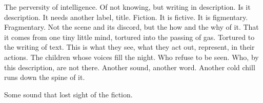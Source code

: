

The perversity of intelligence.  Of not knowing, but writing in
description.  Is it description.  It needs another label, title.
Fiction.  It is fictive.  It is figmentary.  Fragmentary.  Not the
scene and its discord, but the how and the why of it.  That it comes
from one tiny little mind, tortured into the passing of gas.  Tortured
to the writing of text.  This is what they see, what they act out,
represent, in their actions.  The children whose voices fill the
night.  Who refuse to be seen.  Who, by this description, are not
there.  Another sound, another word.  Another cold chill runs down the
spine of it.

Some sound that lost sight of the fiction.

\bye
